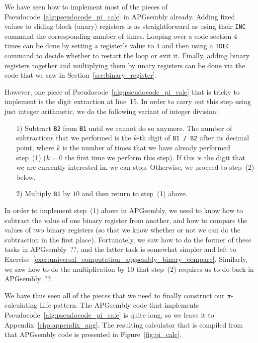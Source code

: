We have seen how to implement most of the pieces of Pseudocode~\ref{alg:pseudocode_pi_calc} in APGsembly already. Adding fixed values to sliding block (unary) registers is as straightforward as using their \texttt{INC} command the corresponding number of times. Looping over a code section $4$ times can be done by setting a register's value to $4$ and then using a \texttt{TDEC} command to decide whether to restart the loop or exit it. Finally, adding binary registers together and multiplying them by unary registers can be done via the code that we saw in Section~\ref{sec:binary_register}.

However, one piece of Pseudocode~\ref{alg:pseudocode_pi_calc} that is tricky to implement is the digit extraction at line~15. In order to carry out this step using just integer arithmetic, we do the following variant of integer division:\smallskip

\begin{enumerate}
	\item[1)] Subtract \texttt{B2} from \texttt{B1} until we cannot do so anymore. The number of subtractions that we performed is the $k$-th digit of \texttt{B1 / B2} after its decimal point, where $k$ is the number of times that we have already performed step~(1) ($k = 0$ the first time we perform this step). If this is the digit that we are currently interested in, we can stop. Otherwise, we proceed to step~(2) below.\smallskip
	
	\item[2)] Multiply \texttt{B1} by $10$ and then return to step~(1) above.\smallskip
\end{enumerate}

In order to implement step~(1) above in APGsembly, we need to know how to subtract the value of one binary register from another, and how to compare the values of two binary registers (so that we know whether or not we can do the subtraction in the first place). Fortunately, we saw how to do the former of these tasks in APGsembly~??, and the latter task is somewhat simpler and left to Exercise~\ref{exer:universal_computation_apgsembly_binary_compare}. Similarly, we saw how to do the multiplication by $10$ that step~(2) requires us to do back in APGsembly~??.

We have thus seen all of the pieces that we need to finally construct our $\pi$-calculating Life pattern. The APGsembly code that implements Pseudocode~\ref{alg:pseudocode_pi_calc} is quite long, so we leave it to Appendix~\ref{chp:appendix_apg}. The resulting calculator that is compiled from that APGsembly code is presented in Figure~\ref{fig:pi_calc}.

